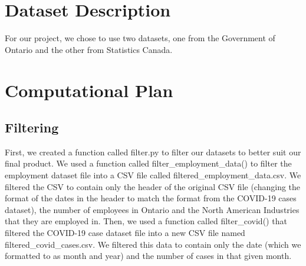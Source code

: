 \documentclass[fontsize=11pt]{article}
\begin{document}
\section{Dataset Description}

For our project, we chose to use two datasets, one from the Government of Ontario and the other from Statistics Canada.\newline

\newline


\newpage
\section{Computational Plan}

\subsection{Filtering}
First, we created a function called filter.py to filter our datasets to better suit our final product. We used a function called filter\_employment\_data() to filter the employment dataset file into a CSV file called filtered\_employment\_data.csv. We filtered the CSV to contain only the header of the original CSV file (changing the format of the dates in the header to match the format from the COVID-19 cases dataset), the number of employees in Ontario and the North American Industries that they are employed in. Then, we used a function called filter\_covid() that filtered the COVID-19 case dataset file into a new CSV file named filtered\_covid\_cases.csv. We filtered this data to contain only the date (which we formatted to as month and year) and the number of cases in that given month. \newline
\end{document}
